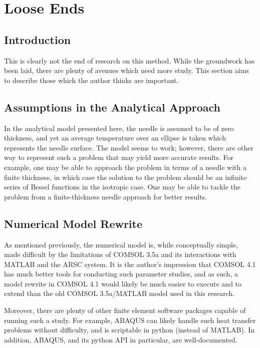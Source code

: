 \chapter{Loose Ends}

\section{Introduction}

This is clearly not the end of research on this method. While the groundwork has
been laid, there are plenty of avenues which need more study. This section aims
to describe those which the author thinks are important.

\section{Assumptions in the Analytical Approach}

In the analytical model presented here, the needle is assumed to be of zero
thickness, and yet an average temperature over an ellipse is taken which
represents the needle surface.  The model seems to work; however, there are
other way to represent such a problem that may yield more accurate results. For
example, one may be able to approach the problem in terms of a needle with a
finite thickness, in which case the solution to the problem should be an
infinite series of Bessel functions in the isotropic case. One may be able to
tackle the problem from a finite-thickness needle approach for better results.

\section{Numerical Model Rewrite}

As mentioned previously, the numerical model is, while conceptually simple, made
difficult by the limitations of COMSOL 3.5a and its interactions with MATLAB and
the ARSC system.  It is the author's impression that COMSOL 4.1 has much better
tools for conducting such parameter studies, and as such, a model rewrite in
COMSOL 4.1 would likely be much easier to execute and to extend than the old
COMSOL 3.5a/MATLAB model used in this research.

Moreover, there are plenty of other finite element software packages capable of
running such a study. For example, ABAQUS can likely handle such heat transfer
problems without difficulty, and is scriptable in python (instead of MATLAB).
In addition, ABAQUS, and its python API in particular, are well-documented.

